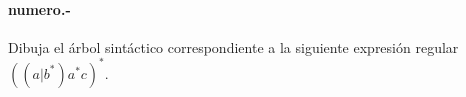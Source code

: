 

\paragraph{{numero}.-}\label{p{numero}}
Dibuja el árbol sintáctico correspondiente a la siguiente expresión regular $ ((a|b^*)a^*c)^* $.
	\myincludegraphicssol{}


